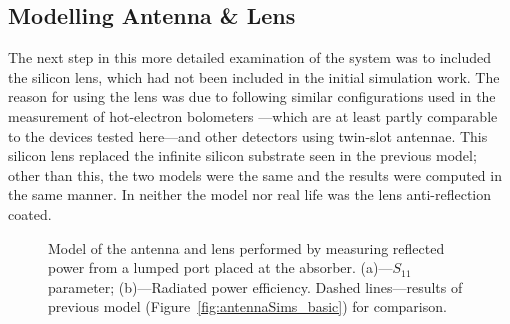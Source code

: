 \subsection{Modelling Antenna \& Lens}\label{ssec:antennaSims_Lens}

The next step in this more detailed examination of the system was to included the silicon lens, which had not been included in the initial simulation work. The reason for using the lens was due to following similar configurations used in the measurement of hot-electron bolometers ---which are at least partly comparable to the devices tested here---and other detectors using twin-slot antennae\parencite[see for example:][along with other works by Karasik on this topic]{Ganzevles2000,Focardi2005,Karasik2011}. This silicon lens replaced the infinite silicon substrate seen in the previous model; other than this, the two models were the same and the results were computed in the same manner. In neither the model nor real life was the lens anti-reflection coated.
\begin{figure}[tb]
\begin{center}
\caption[Model of the antenna and lens performed by measuring reflected power]{Model of the antenna and lens performed by measuring reflected power from a lumped port placed at the absorber. (a)---$S_{11}$ parameter; (b)---Radiated power efficiency. Dashed lines---results of previous model (Figure~\ref{fig:antennaSims_basic}) for comparison.}
\label{fig:antennaSims_lens}
\end{center}
\end{figure}

